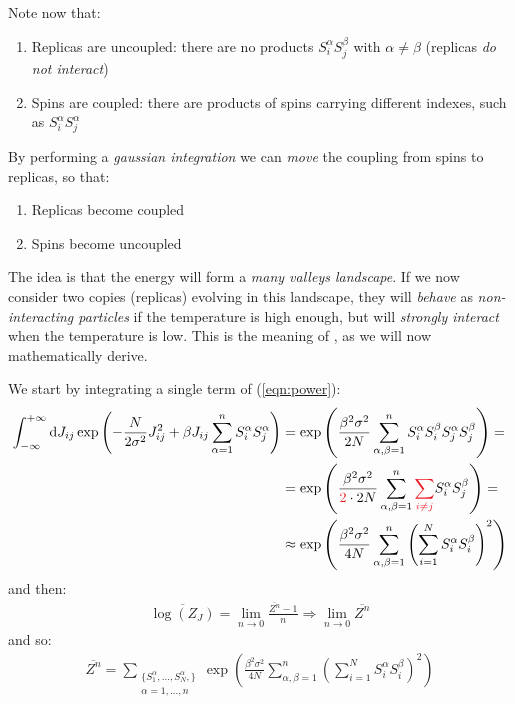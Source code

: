 \documentclass[../template.tex]{subfiles}
\begin{document}
Note now that:
\begin{enumerate}
    \item Replicas are uncoupled: there are no products $S_i^\alpha S_j^\beta$ with $\alpha \neq \beta$ (replicas \textit{do not interact})
    \item Spins are coupled: there are products of spins carrying different indexes, such as $S_i^\alpha S_j^\alpha$   
\end{enumerate}
By performing a \textit{gaussian integration} we can \textit{move} the coupling from spins to replicas, so that:
\begin{enumerate}
    \item Replicas become coupled
    \item Spins become uncoupled
\end{enumerate}  
The idea is that the energy will form a \textit{many valleys landscape}. If we now consider two copies (replicas) evolving in this landscape, they will \textit{behave} as \textit{non-interacting particles} if the temperature is high enough, but will \textit{strongly interact} when the temperature is low. This is the meaning of , as we will now mathematically derive.


We start by integrating a single term of (\ref{eqn:power}):
\begin{align*}
    \int_{-\infty}^{+\infty} \dd{J_{ij}} \exp\left(-\frac{N}{2 \sigma^2} J_{ij}^2 + \beta J_{ij} \sum_{\alpha=1}^n S_i^\alpha S_j^\alpha\right) &= \exp\left(\frac{\beta^2 \sigma^2}{2 N} \sum_{\alpha,\beta=1}^n S_i^\alpha S_i^\beta S_j^\alpha S_j^\beta  \right) =\\
    &= \exp\left(\frac{\beta^2 \sigma^2}{\textcolor{Red}{2} \cdot 2N} \sum_{\alpha,\beta=1}^n \textcolor{Red}{\sum_{i\neq j}} S_i^\alpha S_j^\beta \right) =\\
    &\approx \exp\left(\frac{\beta^2 \sigma^2}{4N} \sum_{\alpha,\beta=1}^n \left(\sum_{i=1}^N S_i^\alpha S_i^\beta\right)^2 \right)
\end{align*}
and then:
\begin{align*}
    \overline{\log(Z_J)} = \lim_{n \to 0} \frac{\overline{Z^n} - 1}{n} \Rightarrow \lim_{n \to 0} \overline{Z^n} 
\end{align*}
and so:
\begin{align*}
    \overline{Z^n} = \sum_{\substack{\{S_1^\alpha,\dots,S_N^\alpha,\}\\ \alpha=1,\dots,n}} \exp\left(\frac{\beta^2 \sigma^2}{4N} \sum_{\alpha,\beta=1}^n \left(\sum_{i=1}^N S_i^\alpha S_i^\beta\right)^2 \right)
\end{align*}
\end{document}
